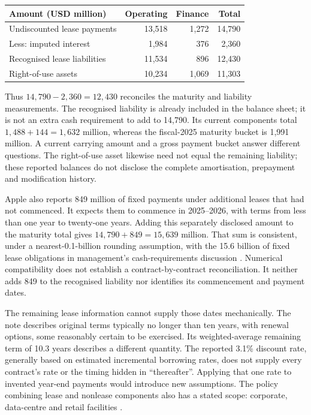 \begin{center}
\begin{tabularx}{\linewidth}{@{}Xrrr@{}}
\toprule
Amount (USD million) & Operating & Finance & Total\\\midrule
Undiscounted lease payments & 13,518 & 1,272 & 14,790\\
Less: imputed interest & 1,984 & 376 & 2,360\\
Recognised lease liabilities & 11,534 & 896 & 12,430\\
Right-of-use assets & 10,234 & 1,069 & 11,303\\\bottomrule
\end{tabularx}
\end{center}

Thus $14{,}790-2{,}360=12{,}430$ reconciles the maturity and liability
measurements. The recognised liability is already included in the balance
sheet; it is not an extra cash requirement to add to 14,790. Its current
components total $1{,}488+144=1{,}632$ million, whereas the fiscal-2025 maturity
bucket is 1,991 million. A current carrying amount and a gross payment bucket
answer different questions. The right-of-use asset likewise need not equal the
remaining liability; these reported balances do not disclose the complete
amortisation, prepayment and modification history.

Apple also reports 849 million of fixed payments under additional leases that
had not commenced. It expects them to commence in 2025--2026, with terms from
less than one year to twenty-one years. Adding this separately disclosed amount
to the maturity total gives $14{,}790+849=15{,}639$ million. That sum is
consistent, under a nearest-0.1-billion rounding assumption, with the 15.6
billion of fixed lease obligations in management's cash-requirements discussion
\citep[printed pp.~25 and 42]{apple2024}. Numerical compatibility does not
establish a contract-by-contract reconciliation. It neither adds 849 to the
recognised liability nor identifies its commencement and payment dates.

The remaining lease information cannot supply those dates mechanically. The
note describes original terms typically no longer than ten years, with renewal
options, some reasonably certain to be exercised. Its weighted-average
remaining term of 10.3 years describes a different quantity. The reported
3.1\% discount rate, generally based on estimated incremental borrowing rates,
does not supply every contract's rate or the timing hidden in ``thereafter''.
Applying that one rate to invented year-end payments would introduce new
assumptions. The policy combining lease and nonlease components also has a
stated scope: corporate, data-centre and retail facilities
\citep[Notes 1 and 8, printed pp.~34 and 42]{apple2024}.

